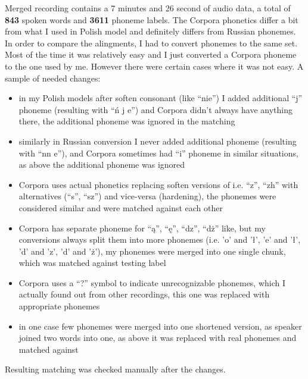 \documentclass[12pt,a4paper,english]{article}
\begin{document}
Merged recording contains a 7 minutes and 26 second of audio data, a total of \textbf{843} spoken words and \textbf{3611} phoneme labels. \newline
The Corpora phonetics differ a bit from what I used in Polish model and definitely differs from Russian phonemes. In order to compare the alingments, I had to convert phonemes to the same set. Most of the time it was relatively easy and I just converted a Corpora phoneme to the one used by me. However there were certain cases where it was not easy.\newline
A sample of needed changes: \newline
\begin{itemize}
    \item in my Polish models after soften consonant (like “nie”) I added additional “j” phoneme (resulting with “ń j e”) and Corpora didn't always have anything there, \newline
    the additional phoneme was ignored in the matching
    \item similarly in Russian conversion I never added additional phoneme (resulting with “nn e”), and Corpora sometimes had “i” phoneme in similar situations, \newline
    as above the additional phoneme was ignored
    \item Corpora uses actual phonetics replacing soften versions of i.e. “z”, “zh” with alternatives (“s”, “sz”) and vice-versa (hardening), \newline
    the phonemes were considered similar and were matched against each other
    \item Corpora has separate phoneme for “ą”, “ę”, “dz”, “dż” like, but my conversions always split them into more phonemes (i.e. 'o' and 'ł', 'e' and 'ł', 'd' and 'z', 'd' and 'ż'), \newline
    my phonemes were merged into one single chunk, which was matched against testing label
    \item Corpora uses a “?” symbol to indicate unrecognizable phonemes, which I actually found out from other recordings, \newline
    this one was replaced with appropriate phonemes
    \item in one case few phonemes were merged into one shortened version, as speaker joined two words into one, \newline
    as above it was replaced with real phonemes and matched against
\end{itemize}
Resulting matching was checked manually after the changes. \newline
\end{document}

